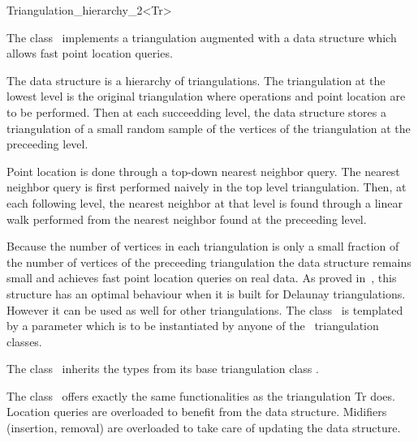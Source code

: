 

\begin{ccRefClass}{Triangulation_hierarchy_2<Tr>}

\ccDefinition
The class \ccRefName\ implements a triangulation augmented with
a data structure which allows fast point location queries.

The data structure is a hierarchy 
of triangulations. The triangulation at the lowest level is
the original triangulation where operations and point location are to 
be performed.
Then at each succeedding level, the data structure
stores a triangulation of a small random sample of the vertices
of the triangulation at the preceeding level. 

Point location
is done through a top-down nearest neighbor query.
The nearest neighbor query is first
performed naively in the top level triangulation.
Then, at each following level, the nearest neighbor at that level
is found through a linear walk performed from
the nearest neighbor found at the preceeding level.

Because the number of vertices in each triangulation is only a small
fraction of the number of vertices of the preceeding triangulation 
the data structure remains small and achieves fast point location 
queries on real
data. As proved in~\cite{d-iirdt-98}, this structure has an optimal behaviour
when it is built for Delaunay triangulations.
However it can be used as well for other triangulations.
The class \ccRefName\ is templated by a parameter
which is to be instantiated by anyone of the \cgal\ triangulation
classes.


\ccInheritsFrom
{}

\ccTypes
The class \ccRefName\ inherits the types from its base triangulation
class . 

The class \ccRefName\ offers exactly the same functionalities
as the triangulation Tr does.
Location queries are overloaded to benefit from the
data structure. Midifiers (insertion, removal) are overloaded
to take care of updating the data structure.


\end{ccRefClass}
